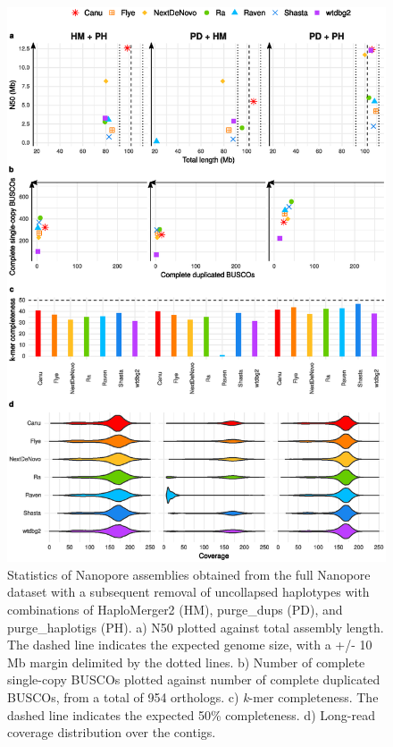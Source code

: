    \begin{figure}[ht]
    \centering
     \includegraphics[width=13.5cm]{fig/benchmark/supp_nanopore_purging_combinations_v20200919.eps}
   \caption{Statistics of Nanopore assemblies obtained from the full Nanopore dataset with a subsequent removal of uncollapsed haplotypes with combinations of HaploMerger2 (HM), purge\_dups (PD), and purge\_haplotigs (PH). a) N50 plotted against total assembly length. The dashed line indicates the expected genome size, with a +/- 10 Mb margin delimited by the dotted lines. b) Number of complete single-copy BUSCOs plotted against number of complete duplicated BUSCOs, from a total of 954 orthologs. c) \textit{k}-mer completeness. The dashed line indicates the expected 50\% completeness. d) Long-read coverage distribution over the contigs.}
   \label{fig:nanopore_purging_combinations}
 \end{figure}
 
